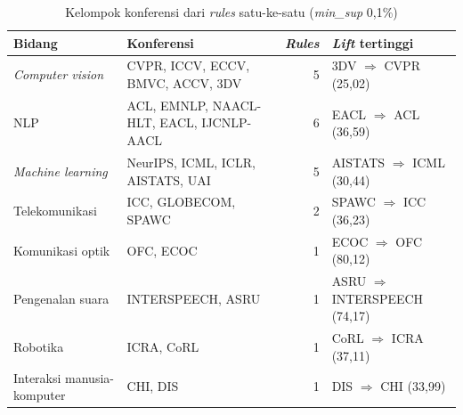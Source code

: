 \begin{table}[!htb]
\caption{Kelompok konferensi dari \textit{rules} satu-ke-satu (\textit{min\_sup} 0,1\%)}
\label{tab:t5-kelompok}
\small
\begin{tabularx}{\textwidth}{@{}l>{\raggedright\arraybackslash}Xr>{\raggedright\arraybackslash}p{3.6cm}@{}}
\toprule
\textbf{Bidang} & \textbf{Konferensi} & \textbf{\textit{Rules}} & \textbf{\textit{Lift} tertinggi} \\
\midrule
\textit{Computer vision} & CVPR, ICCV, ECCV, BMVC, ACCV, 3DV & 5 & 3DV $\Rightarrow$ CVPR (25,02) \\
NLP & ACL, EMNLP, NAACL-HLT, EACL, IJCNLP-AACL & 6 & EACL $\Rightarrow$ ACL (36,59) \\
\textit{Machine learning} & NeurIPS, ICML, ICLR, AISTATS, UAI & 5 & AISTATS $\Rightarrow$ ICML (30,44) \\
Telekomunikasi & ICC, GLOBECOM, SPAWC & 2 & SPAWC $\Rightarrow$ ICC (36,23) \\
Komunikasi optik & OFC, ECOC & 1 & ECOC $\Rightarrow$ OFC (80,12) \\
Pengenalan suara & INTERSPEECH, ASRU & 1 & ASRU $\Rightarrow$ INTERSPEECH (74,17) \\
Robotika & ICRA, CoRL & 1 & CoRL $\Rightarrow$ ICRA (37,11) \\
Interaksi manusia-komputer & CHI, DIS & 1 & DIS $\Rightarrow$ CHI (33,99) \\
\bottomrule
\end{tabularx}
\end{table}

